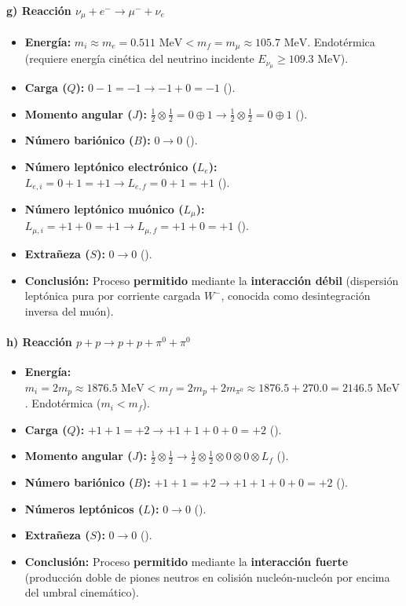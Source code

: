 \begin{problema}
\paragraph{g) Reacción $\nu_\mu + e^- \to \mu^- + \nu_e$}
\begin{itemize}
    \item \textbf{Energía:} $m_i \approx m_e = 0.511\text{ MeV} < m_f = m_\mu \approx 105.7\text{ MeV}$. Endotérmica (requiere energía cinética del neutrino incidente $E_{\nu_\mu} \ge 109.3\text{ MeV}$).
    \item \textbf{Carga ($Q$):} $0 - 1 = -1 \to -1 + 0 = -1$ (\checkmark).
    \item \textbf{Momento angular ($J$):} $\frac{1}{2} \otimes \frac{1}{2} = 0 \oplus 1 \to \frac{1}{2} \otimes \frac{1}{2} = 0 \oplus 1$ (\checkmark).
    \item \textbf{Número bariónico ($B$):} $0 \to 0$ (\checkmark).
    \item \textbf{Número leptónico electrónico ($L_e$):} $L_{e,i} = 0 + 1 = +1 \to L_{e,f} = 0 + 1 = +1$ (\checkmark).
    \item \textbf{Número leptónico muónico ($L_\mu$):} $L_{\mu,i} = +1 + 0 = +1 \to L_{\mu,f} = +1 + 0 = +1$ (\checkmark).
    \item \textbf{Extrañeza ($S$):} $0 \to 0$ (\checkmark).
    \item \textbf{Conclusión:} Proceso \textbf{permitido} mediante la \textbf{interacción débil} (dispersión leptónica pura por corriente cargada $W^-$, conocida como desintegración inversa del muón).
\end{itemize}

\paragraph{h) Reacción $p + p \to p + p + \pi^0 + \pi^0$}
\begin{itemize}
    \item \textbf{Energía:} $m_i = 2 m_p \approx 1876.5\text{ MeV} < m_f = 2 m_p + 2 m_{\pi^0} \approx 1876.5 + 270.0 = 2146.5\text{ MeV}$. Endotérmica ($m_i < m_f$).
    \item \textbf{Carga ($Q$):} $+1 + 1 = +2 \to +1 + 1 + 0 + 0 = +2$ (\checkmark).
    \item \textbf{Momento angular ($J$):} $\frac{1}{2} \otimes \frac{1}{2} \to \frac{1}{2} \otimes \frac{1}{2} \otimes 0 \otimes 0 \otimes L_f$ (\checkmark).
    \item \textbf{Número bariónico ($B$):} $+1 + 1 = +2 \to +1 + 1 + 0 + 0 = +2$ (\checkmark).
    \item \textbf{Números leptónicos ($L$):} $0 \to 0$ (\checkmark).
    \item \textbf{Extrañeza ($S$):} $0 \to 0$ (\checkmark).
    \item \textbf{Conclusión:} Proceso \textbf{permitido} mediante la \textbf{interacción fuerte} (producción doble de piones neutros en colisión nucleón-nucleón por encima del umbral cinemático).
\end{itemize}
\end{problema}
